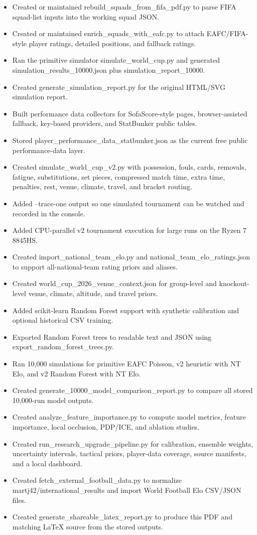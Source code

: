 \documentclass[10pt]{article}
\begin{document}
\begin{itemize}
  \item Created or maintained rebuild\_squads\_from\_fifa\_pdf.py to parse FIFA squad-list inputs into the working squad JSON.
  \item Created or maintained enrich\_squads\_with\_eafc.py to attach EAFC/FIFA-style player ratings, detailed positions, and fallback ratings.
  \item Ran the primitive simulator simulate\_world\_cup.py and generated simulation\_results\_10000.json plus simulation\_report\_10000.
  \item Created generate\_simulation\_report.py for the original HTML/SVG simulation report.
  \item Built performance data collectors for SofaScore-style pages, browser-assisted fallback, key-based providers, and StatBunker public tables.
  \item Stored player\_performance\_data\_statbunker.json as the current free public performance-data layer.
  \item Created simulate\_world\_cup\_v2.py with possession, fouls, cards, removals, fatigue, substitutions, set pieces, compressed match time, extra time, penalties, rest, venue, climate, travel, and bracket routing.
  \item Added --trace-one output so one simulated tournament can be watched and recorded in the console.
  \item Added CPU-parallel v2 tournament execution for large runs on the Ryzen 7 8845HS.
  \item Created import\_national\_team\_elo.py and national\_team\_elo\_ratings.json to support all-national-team rating priors and aliases.
  \item Created world\_cup\_2026\_venue\_context.json for group-level and knockout-level venue, climate, altitude, and travel priors.
  \item Added scikit-learn Random Forest support with synthetic calibration and optional historical CSV training.
  \item Exported Random Forest trees to readable text and JSON using export\_random\_forest\_trees.py.
  \item Ran 10,000 simulations for primitive EAFC Poisson, v2 heuristic with NT Elo, and v2 Random Forest with NT Elo.
  \item Created generate\_10000\_model\_comparison\_report.py to compare all stored 10,000-run model outputs.
  \item Created analyze\_feature\_importance.py to compute model metrics, feature importance, local occlusion, PDP/ICE, and ablation studies.
  \item Created run\_research\_upgrade\_pipeline.py for calibration, ensemble weights, uncertainty intervals, tactical priors, player-data coverage, source manifests, and a local dashboard.
  \item Created fetch\_external\_football\_data.py to normalize martj42/international\_results and import World Football Elo CSV/JSON files.
  \item Created generate\_shareable\_latex\_report.py to produce this PDF and matching LaTeX source from the stored outputs.
\end{itemize}
\end{document}
